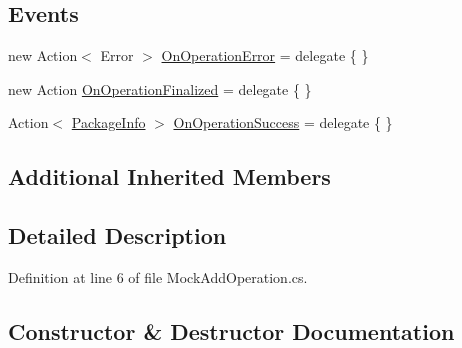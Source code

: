 \subsection*{Events}
\begin{DoxyCompactItemize}
\item 
new Action$<$ Error $>$ \mbox{\hyperlink{class_unity_editor_1_1_package_manager_1_1_u_i_1_1_tests_1_1_mock_add_operation_a04c46b925ae27c871d32c763d6ae232e}{On\+Operation\+Error}} = delegate \{ \}
\item 
new Action \mbox{\hyperlink{class_unity_editor_1_1_package_manager_1_1_u_i_1_1_tests_1_1_mock_add_operation_aff278f53a4a6c41d0b35a1e0ee40397c}{On\+Operation\+Finalized}} = delegate \{ \}
\item 
Action$<$ \mbox{\hyperlink{class_unity_editor_1_1_package_manager_1_1_u_i_1_1_package_info}{Package\+Info}} $>$ \mbox{\hyperlink{class_unity_editor_1_1_package_manager_1_1_u_i_1_1_tests_1_1_mock_add_operation_aa52928a2ce6a6df6d83b1c1572d34a30}{On\+Operation\+Success}} = delegate \{ \}
\end{DoxyCompactItemize}
\subsection*{Additional Inherited Members}


\subsection{Detailed Description}


Definition at line 6 of file Mock\+Add\+Operation.\+cs.



\subsection{Constructor \& Destructor Documentation}
\mbox{\label{class_unity_editor_1_1_package_manager_1_1_u_i_1_1_tests_1_1_mock_add_operation_a4a34c3a1385aae59f5a420eff9bfa696}} 
